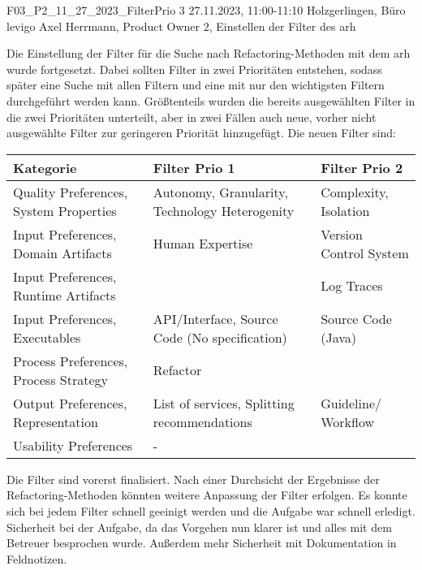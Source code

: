 \fieldnote
{F03\_P2\_11\_27\_2023\_FilterPrio}
{3}
{27.11.2023, 11:00-11:10}
{Holzgerlingen, Büro levigo}
{Axel Herrmann, Product Owner}
{2, Einstellen der Filter des \gls{arh}}
{
	Die Einstellung der Filter für die Suche nach Refactoring-Methoden mit dem \gls{arh} wurde fortgesetzt.
	Dabei sollten Filter in zwei Prioritäten entstehen, sodass später eine Suche mit allen Filtern und eine mit nur den wichtigsten Filtern durchgeführt werden kann.
	Größtenteils wurden die bereits ausgewählten Filter in die zwei Prioritäten unterteilt, aber in zwei Fällen auch neue, vorher nicht ausgewählte Filter zur geringeren Priorität hinzugefügt.
	Die neuen Filter sind:
	\begin{tabular}{|p{3cm}|p{3.5cm}|p{3cm}|}
		\hline
		\textbf{Kategorie} & \textbf{Filter Prio 1} & \textbf{Filter Prio 2} \\ \hline
		Quality Preferences, System Properties & Autonomy, Granularity, Technology Heterogenity & Complexity, Isolation \\ \hline
		Input Preferences, Domain Artifacts & Human Expertise & Version Control System \\ \hline
		Input Preferences, Runtime Artifacts & & Log Traces \\ \hline
		Input Preferences, Executables & API/Interface, Source Code (No specifica\-tion) & Source Code (Java) \\ \hline
		Process Preferences, Process Strategy & Refactor & \\ \hline
		Output Preferences, Representation & List of services, Split\-ting recommendations & Guideline/ Workflow \\ \hline
		Usability Preferences & - & \\ \hline
	\end{tabular}
}
{
	Die Filter sind vorerst finalisiert. Nach einer Durchsicht der Ergebnisse der Refactoring-Methoden könnten weitere Anpassung der Filter erfolgen.
}
{
	Es konnte sich bei jedem Filter schnell geeinigt werden und die Aufgabe war schnell erledigt.
}
{}
{
	Sicherheit bei der Aufgabe, da das Vorgehen nun klarer ist und alles mit dem Betreuer besprochen wurde.
	Außerdem mehr Sicherheit mit Dokumentation in Feldnotizen.
}
